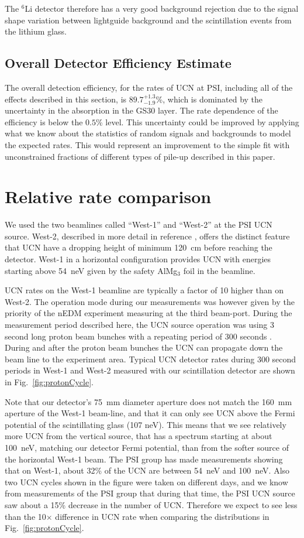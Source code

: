 \documentclass[letter,twocolumn,preprint,3p]{elsarticle}
\begin{document}
The $^6$Li detector therefore has a very good background rejection due
to the signal shape variation between lightguide background and the
scintillation events from the lithium glass.

\subsection{Overall Detector Efficiency Estimate}

The overall detection efficiency, for the rates of UCN at PSI,
including all of the effects described in this section, is
$89.7^{+1.3}_{-1.9}$\%, which is dominated by the uncertainty in the
absorption in the GS30 layer. The rate dependence of the efficiency is
below the $0.5$\% level.  This uncertainty could be improved by
applying what we know about the statistics of random signals and
backgrounds to model the expected rates.  This would represent an
improvement to the simple fit with unconstrained fractions of
different types of pile-up described in this paper.


\section{ Relative rate comparison }\label{sec:relative}

We used the two beamlines called ``West-1'' and ``West-2'' at the PSI
UCN source\cite{ucnBeam}.  West-2, described in more detail in
reference \cite{ucnBeam}, offers the distinct feature that UCN have a
dropping height of minimum 120~cm before reaching the detector.
West-1 in a horizontal configuration provides UCN with energies
starting above 54~neV given by the safety AlMg$_3$ foil in the
beamline.  

UCN rates on the West-1 beamline are typically a factor of
10 higher than on West-2.  The operation mode during our measurements
was however given by the priority of the nEDM experiment measuring at
the third beam-port.  During the measurement period described here, the
UCN source operation was using 3 second long proton beam bunches with
a repeating period of 300 seconds .  During and after the proton beam
bunches the UCN can propagate down the beam line to the experiment
area.  Typical UCN detector rates during 300 second periods in West-1
and West-2 measured with our scintillation detector are shown in
Fig.~\ref{fig:protonCycle}.  

Note that our detector's 75~mm diameter
aperture does not match the 160~mm aperture of the West-1 beam-line,
and that it can only see UCN above the Fermi potential of the
scintillating glass (107 neV).  This means that we see relatively
more UCN from the vertical source, that has a spectrum starting at
about 100~neV, matching our detector Fermi potential, than from the
softer source of the horizontal West-1 beam.  The PSI group has made
measurements showing that on West-1, about 32\% of the UCN are between
54~neV and 100~neV.  Also two UCN cycles shown in the figure were
taken on different days, and we know from measurements of the PSI
group that during that time, the PSI UCN source saw about a 15\%
decrease in the number of UCN.  Therefore we expect to see less than
the 10$\times$ difference in UCN rate when comparing the distributions
in Fig.~\ref{fig:protonCycle}.
\end{document}
